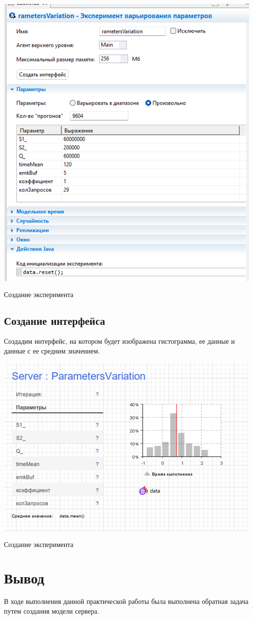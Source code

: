 \begin{image}
	\includegraphics[width=1\textwidth]{img2}
	\caption{Создание эксперимента}
	\label{fig:data:res}
\end{image}

\clearpage

\subsection{Создание интерфейса}
Создадим интерфейс, на котором будет изображена гистограмма, ее данные и данные с ее средним значением.

\begin{image}
	\includegraphics[width=1\textwidth]{img3}
	\caption{Создание эксперимента}
	\label{fig:interface}
\end{image}

\clearpage

\section*{\LARGE Вывод}
В ходе выполнения данной практической работы была выполнена обратная задача путем создания модели сервера.
